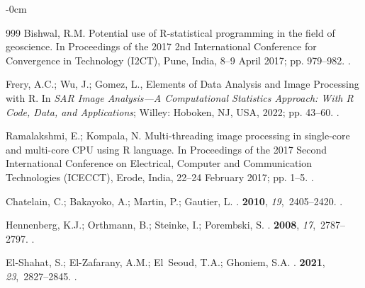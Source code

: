 \documentclass[jimaging,article,accept,pdftex,moreauthors]{Definitions/mdpi}
\begin{document}
\begin{adjustwidth}{-\extralength}{0cm}
\begin{thebibliography}{999}
Bishwal, R.M.
\newblock Potential use of R-statistical programming in the field of
  geoscience.
\newblock In Proceedings of the 2017 2nd International Conference for
  Convergence in Technology (I2CT), Pune, India, 8--9 April 2017; pp. 979--982.
.

Frery, A.C.; Wu, J.; Gomez, L., Elements of Data Analysis and Image Processing
  with R.
\newblock In {\em SAR Image Analysis---A Computational Statistics Approach:
  With R Code, Data, and Applications}; Willey:  Hoboken, NJ, USA, %
 2022; pp. 43--60.
.

Ramalakshmi, E.; Kompala, N.
\newblock Multi-threading image processing in single-core and multi-core CPU
  using R language.
\newblock In Proceedings of the 2017 Second International Conference on
  Electrical, Computer and Communication Technologies (ICECCT), Erode, India, 22--24 February 2017; pp.
  1--5.
.

Chatelain, C.; Bakayoko, A.; Martin, P.; Gautier, L.
.
 {\bf 2010}, {\em 19},~2405--2420.
.

Hennenberg, K.J.; Orthmann, B.; Steinke, I.; Porembski, S.
.
 {\bf 2008}, {\em
  17},~2787--2797.
.

El-Shahat, S.; El-Zafarany, A.M.; El~Seoud, T.A.; Ghoniem, S.A.
.
 {\bf 2021}, {\em
  23},~2827--2845.
.


\end{thebibliography}
\end{adjustwidth}
\end{document}
